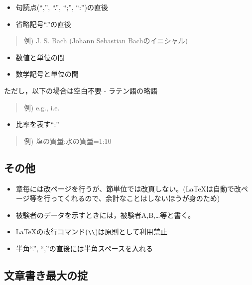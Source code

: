 \documentclass[12pt, ]{jsarticle}
\providecommand{\tightlist}{%
   \setlength{\itemsep}{0pt}\setlength{\parskip}{0pt}}
\begin{document}
\begin{itemize}
\tightlist
\item
  句読点(``,'', ``.'', ``;'', ``:'')の直後
\item
  省略記号``.''の直後
\end{itemize}

\begin{quote}
例) J. S. Bach (Johann Sebastian Bachのイニシャル)
\end{quote}

\begin{itemize}
\tightlist
\item
  数値と単位の間
\item
  数学記号と単位の間
\end{itemize}

ただし，以下の場合は空白不要 - ラテン語の略語

\begin{quote}
例) e.g., i.e.
\end{quote}

\begin{itemize}
\tightlist
\item
  比率を表す``:''
\end{itemize}

\begin{quote}
例) 塩の質量:水の質量=1:10
\end{quote}

\subsection{その他}\label{ux305dux306eux4ed6}

\begin{itemize}
\tightlist
\item
  章毎には改ページを行うが、節単位では改頁しない。(LaTeXは自動で改ページ等を行ってくれるので、余計なことはしないほうが身のため)
\item
  被験者のデータを示すときには，被験者A,B,\ldots{}等と書く。
\item
  LaTeXの改行コマンド(\lstinline!\\!)は原則として利用禁止
\item
  半角``.'', ``,''の直後には半角スペースを入れる
\end{itemize}

\subsection{文章書き最大の掟}\label{ux6587ux7ae0ux66f8ux304dux6700ux5927ux306eux639f}
\end{document}
